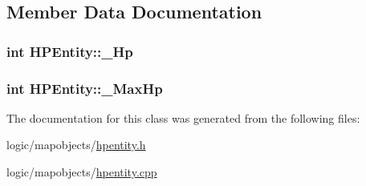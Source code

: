 \subsection{Member Data Documentation}
\hypertarget{class_h_p_entity_a3d72ffce5b3a795816229b5cfb1e221d}{
\subsubsection[{\-\_\-\-Hp}]{\setlength{\rightskip}{0pt plus 5cm}int H\-P\-Entity\-::\-\_\-\-Hp\hspace{0.3cm}{\ttfamily [protected]}}}\label{class_h_p_entity_a3d72ffce5b3a795816229b5cfb1e221d}
\hypertarget{class_h_p_entity_a484307e81bbf22dbc7fdc11d0ee1c7d3}{
\subsubsection[{\-\_\-\-Max\-Hp}]{\setlength{\rightskip}{0pt plus 5cm}int H\-P\-Entity\-::\-\_\-\-Max\-Hp\hspace{0.3cm}{\ttfamily [protected]}}}\label{class_h_p_entity_a484307e81bbf22dbc7fdc11d0ee1c7d3}


The documentation for this class was generated from the following files\-:\begin{DoxyCompactItemize}
\item 
logic/mapobjects/\hyperlink{hpentity_8h}{hpentity.\-h}\item 
logic/mapobjects/\hyperlink{hpentity_8cpp}{hpentity.\-cpp}\end{DoxyCompactItemize}
